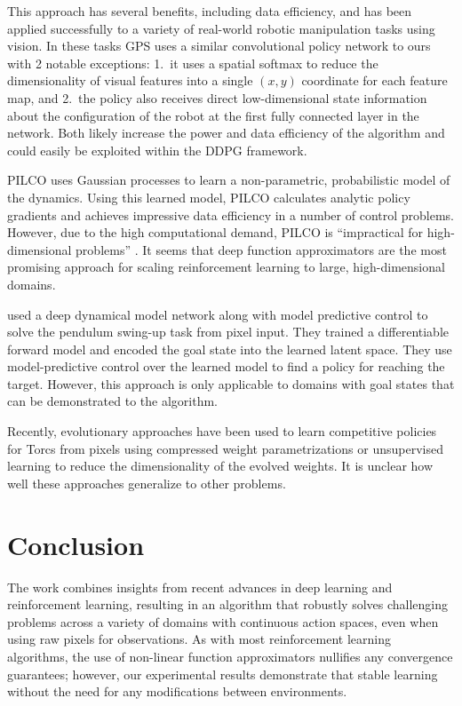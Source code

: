 \documentclass{article} %
\begin{document}
This approach has several benefits, including data efficiency, and has been
applied successfully to a variety of real-world
robotic manipulation tasks using vision.
In these tasks GPS uses a similar convolutional policy network to ours with
2 notable exceptions: 1.\ it uses a spatial softmax to reduce the
dimensionality of visual features into a single $(x,y)$ coordinate for
each feature map, and
2.\ the policy also receives direct low-dimensional state information
about the configuration of the robot at the first fully connected
layer in the network.  Both likely increase the power and data
efficiency of the algorithm and could easily be exploited within the DDPG
framework.

PILCO \citep{deisenroth2011pilco} uses Gaussian processes to learn a
non-parametric, probabilistic model of the dynamics. Using this learned model,
PILCO calculates analytic policy gradients and achieves impressive
data efficiency in a number of control problems. However, due to the
high computational demand, PILCO is
``impractical for high-dimensional problems''
\citep{wahlstrom2015pixels}. It seems that deep function approximators
are the most promising approach for scaling reinforcement learning to
large, high-dimensional domains.

\citet{wahlstrom2015pixels}
used a deep dynamical model network
along with model predictive control to solve the pendulum
swing-up task from pixel input.  They trained a differentiable forward model
and encoded the goal state into the learned latent space.
They use model-predictive control over the learned model
to find a policy for reaching the target.
However, this approach is only applicable to domains with goal states that
can be demonstrated to the algorithm.

Recently, evolutionary approaches have been used to learn
competitive policies for Torcs from pixels
using compressed weight parametrizations \citep{koutnik2014evolving} or
unsupervised learning \citep{koutnik2014online}
to reduce the dimensionality
of the evolved weights. It is unclear how well these
approaches generalize to other problems.

\section{Conclusion}

The work combines insights from recent advances in deep
learning and reinforcement learning, resulting in an algorithm that
robustly solves challenging problems across a variety of domains with
continuous action spaces, even when using raw pixels for observations.
As with most reinforcement learning algorithms, the
use of non-linear function approximators nullifies any convergence
guarantees; however, our experimental results demonstrate that stable
learning without the need for any modifications between environments.
\end{document}
